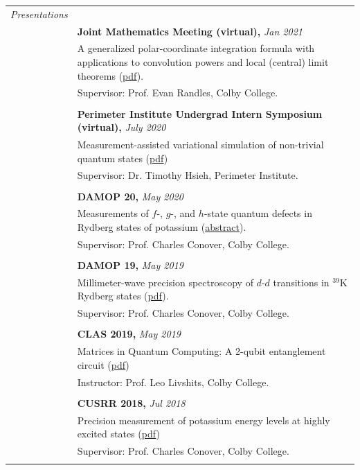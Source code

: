 \documentclass[10pt]{article}
\begin{document}
\begin{longtable}{ l p{15cm}   }
\large{\textit{Presentations}}   	& \\
	& \textbf{Joint Mathematics Meeting (virtual),} \textit{Jan 2021}\\
	& A generalized polar-coordinate integration formula with applications to convolution powers and local (central) limit theorems (\href{https://jointmathematicsmeetings.org/amsmtgs/2247_abstracts/1163-42-1122.pdf}{{pdf}}).\\
& Supervisor: Prof. Evan Randles, Colby College. \\
&\\
& \textbf{Perimeter Institute Undergrad Intern Symposium (virtual),} \textit{July 2020}\\
& Measurement-assisted variational simulation of non-trivial quantum states (\href{https://huanqbui.com/LaTeX 20projects/HuanBui_Perimeter/Presentation/MBQC_as_Simulation.pdf}{{pdf}})\\
& Supervisor: Dr. Timothy Hsieh, Perimeter Institute. \\
&\\
& \textbf{DAMOP 20,} \textit{May 2020}\\
& Measurements of $f$-, $g$-, and $h$-state quantum defects in Rydberg states of potassium (\href{http://meetings.aps.org/Meeting/DAMOP20/Session/K01.17}{abstract}).\\
& Supervisor: Prof. Charles Conover, Colby College.\\
&\\
& \textbf{DAMOP 19,} \textit{May 2019} \\
& Millimeter-wave precision spectroscopy of $d$-$d$ transitions in $^{\text{39}}$K Rydberg states (\href{https://huanqbui.com/research/DAMOP19 20poster/DAMOP19.pdf}{{pdf}}).\\
& Supervisor: Prof. Charles Conover, Colby College.\\
& \\
& \textbf{CLAS 2019,} \textit{May 2019}\\
& Matrices in Quantum Computing: A 2-qubit entanglement circuit (\href{https://huanqbui.com/LaTeX 20projects/Matrix_Analysis/CLAS 202019/Quantum-Circuit.pdf}{{pdf}})\\
& Instructor: Prof. Leo Livshits, Colby College.\\
&\\
& \textbf{CUSRR 2018,} \textit{Jul 2018}\\
& Precision measurement of potassium energy levels at highly excited states (\href{https://huanqbui.com/research/CUSRR2018.pdf}{{pdf}})\\
& Supervisor: Prof. Charles Conover, Colby College.\\
& \\ 
     					 

\end{longtable}
\end{document}
